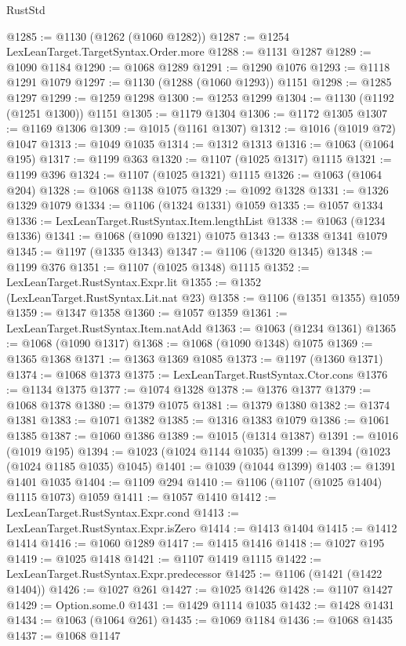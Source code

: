 \begin{lexlean}{RustStd}
\begin{coremodule}
@1285 := @1130 (@1262 (@1060 @1282))
@1287 := @1254 LexLeanTarget.TargetSyntax.Order.more
@1288 := @1131 @1287
@1289 := @1090 @1184
@1290 := @1068 @1289
@1291 := @1290 @1076
@1293 := @1118 @1291 @1079
@1297 := @1130 (@1288 (@1060 @1293)) @1151
@1298 := @1285 @1297
@1299 := @1259 @1298
@1300 := @1253 @1299
@1304 := @1130 (@1192 (@1251 @1300)) @1151
@1305 := @1179 @1304
@1306 := @1172 @1305
@1307 := @1169 @1306
@1309 := @1015 (@1161 @1307)
@1312 := @1016 (@1019 @72) @1047
@1313 := @1049 @1035
@1314 := @1312 @1313
@1316 := @1063 (@1064 @195)
@1317 := @1199 @363
@1320 := @1107 (@1025 @1317) @1115
@1321 := @1199 @396
@1324 := @1107 (@1025 @1321) @1115
@1326 := @1063 (@1064 @204)
@1328 := @1068 @1138 @1075
@1329 := @1092 @1328
@1331 := @1326 @1329 @1079
@1334 := @1106 (@1324 @1331) @1059
@1335 := @1057 @1334
@1336 := LexLeanTarget.RustSyntax.Item.lengthList
@1338 := @1063 (@1234 @1336)
@1341 := @1068 (@1090 @1321) @1075
@1343 := @1338 @1341 @1079
@1345 := @1197 (@1335 @1343)
@1347 := @1106 (@1320 @1345)
@1348 := @1199 @376
@1351 := @1107 (@1025 @1348) @1115
@1352 := LexLeanTarget.RustSyntax.Expr.lit
@1355 := @1352 (LexLeanTarget.RustSyntax.Lit.nat @23)
@1358 := @1106 (@1351 @1355) @1059
@1359 := @1347 @1358
@1360 := @1057 @1359
@1361 := LexLeanTarget.RustSyntax.Item.natAdd
@1363 := @1063 (@1234 @1361)
@1365 := @1068 (@1090 @1317)
@1368 := @1068 (@1090 @1348) @1075
@1369 := @1365 @1368
@1371 := @1363 @1369 @1085
@1373 := @1197 (@1360 @1371)
@1374 := @1068 @1373
@1375 := LexLeanTarget.RustSyntax.Ctor.cons
@1376 := @1134 @1375
@1377 := @1074 @1328
@1378 := @1376 @1377
@1379 := @1068 @1378
@1380 := @1379 @1075
@1381 := @1379 @1380
@1382 := @1374 @1381
@1383 := @1071 @1382
@1385 := @1316 @1383 @1079
@1386 := @1061 @1385
@1387 := @1060 @1386
@1389 := @1015 (@1314 @1387)
@1391 := @1016 (@1019 @195)
@1394 := @1023 (@1024 @1144 @1035)
@1399 := @1394 (@1023 (@1024 @1185 @1035) @1045)
@1401 := @1039 (@1044 @1399)
@1403 := @1391 @1401 @1035
@1404 := @1109 @294
@1410 := @1106 (@1107 (@1025 @1404) @1115 @1073) @1059
@1411 := @1057 @1410
@1412 := LexLeanTarget.RustSyntax.Expr.cond
@1413 := LexLeanTarget.RustSyntax.Expr.isZero
@1414 := @1413 @1404
@1415 := @1412 @1414
@1416 := @1060 @1289
@1417 := @1415 @1416
@1418 := @1027 @195
@1419 := @1025 @1418
@1421 := @1107 @1419 @1115
@1422 := LexLeanTarget.RustSyntax.Expr.predecessor
@1425 := @1106 (@1421 (@1422 @1404))
@1426 := @1027 @261
@1427 := @1025 @1426
@1428 := @1107 @1427
@1429 := Option.some.{0}
@1431 := @1429 @1114 @1035
@1432 := @1428 @1431
@1434 := @1063 (@1064 @261)
@1435 := @1069 @1184
@1436 := @1068 @1435
@1437 := @1068 @1147

\end{coremodule}
\end{lexlean}
